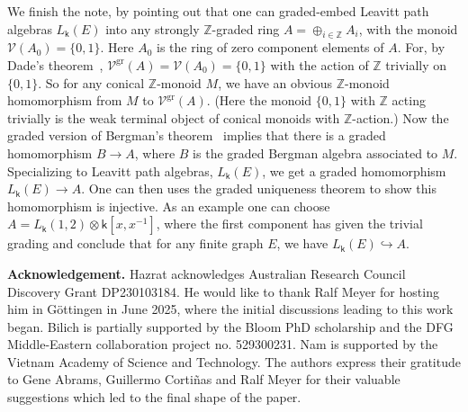 \documentclass[a4paper, 11pt, reqno]{amsart}
\theoremstyle{definition}
\newcommand{\K}{\mathsf{k}}
\newcommand{\gr}{\operatorname{gr}}
\begin{document}
We finish the note, by pointing out that one can graded-embed Leavitt path algebras $L_\K(E)$ into any strongly  $\mathbb Z$-graded ring $A=\oplus_{i\in \mathbb Z}A_i$, with the monoid $\mathcal V(A_0)=\{0,1\}$. Here $A_0$ is the ring of zero component elements of $A$. For, by Dade’s theorem~\cite[\S1.5]{hazi}, $\mathcal  V^{\gr}(A)=\mathcal  V(A_0)=\{0,1\}$ with the action of $\mathbb Z$ trivially on $\{0,1\}$. So for any conical $\mathbb Z$-monoid $M$, we have an obvious $\mathbb Z$-monoid homomorphism from $M$ to $\mathcal V^{\gr}(A)$. (Here the monoid $\{0,1\}$ with 
$\mathbb Z$ acting trivially is the weak terminal object of conical monoids with $\mathbb Z$-action.) Now the graded version of Bergman's theorem~\cite[Theorem~8.1]{hazlipre} implies that there is a graded homomorphism $B\rightarrow A$, where $B$ is the graded Bergman algebra associated to $M$. 
Specializing to Leavitt path algebras, $L_\K(E)$, 
we get a graded homomorphism $L_\K(E)\rightarrow A$. One can then uses the graded uniqueness theorem to show this homomorphism is injective. As an example one can choose $A=L_\K(1,2)\otimes \K[x,x^{-1}]$, where the first component has given the trivial grading and conclude that for any finite graph $E$, we have $L_\K(E) \hookrightarrow A$.



{\bf Acknowledgement.} 
Hazrat acknowledges Australian Research Council Discovery Grant DP230103184. He would like to thank Ralf Meyer for hosting him in G\"ottingen in June 2025, where the initial discussions leading to this work began.
Bilich is partially supported by the Bloom PhD scholarship and the DFG Middle-Eastern collaboration project no. 529300231. Nam is supported by the Vietnam Academy of Science and Technology.
The authors express their gratitude to Gene Abrams, Guillermo Corti\~nas and Ralf Meyer for their valuable suggestions which led to the final shape of the paper.
\end{document}
